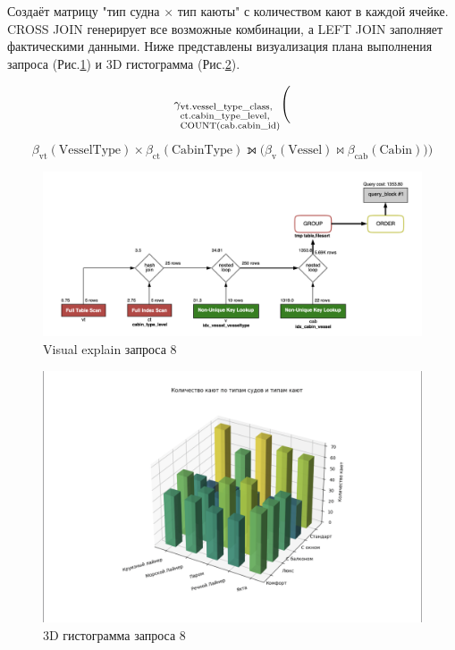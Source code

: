 \documentclass[11pt,a4paper,final]{article}
\begin{document}
Создаёт матрицу "тип судна × тип каюты" с количеством кают в каждой ячейке. CROSS JOIN генерирует все возможные комбинации, а LEFT JOIN заполняет фактическими данными. Ниже представлены визуализация плана выполнения запроса (Рис.\ref{fig:expl8}) и 3D гистограмма (Рис.\ref{fig:hist8}).

$$
\gamma_{\begin{subarray}{l}
\text{vt.vessel\_type\_class}, \\
\text{ct.cabin\_type\_level}, \\
\text{COUNT(cab.cabin\_id)}
\end{subarray}} \Bigg(
$$

$$
\beta_{\text{vt}}(\text{VesselType}) \times \beta_{\text{ct}}(\text{CabinType}) \leftouterjoin \Big( \beta_{\text{v}}(\text{Vessel}) \bowtie \beta_{\text{cab}}(\text{Cabin}) \Big) \Bigg)
$$


\begin{figure}[H]
    \centering
    \includegraphics[width=\textwidth]{38.png} 
    \caption{Visual explain запроса 8}
    \label{fig:expl8}
\end{figure}

\begin{figure}[H]
    \centering
    \includegraphics[width=\textwidth]{50.png} 
    \caption{3D гистограмма  запроса 8}
    \label{fig:hist8}
\end{figure}
\end{document}
